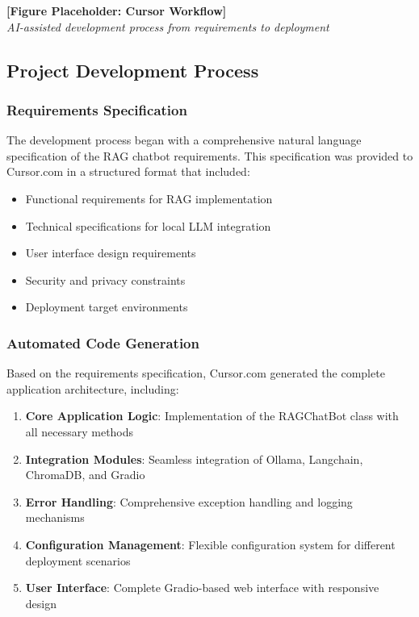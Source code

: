 \documentclass[12pt,letterpaper]{article}
\begin{document}
\begin{center}
\textbf{[Figure Placeholder: Cursor Workflow]}\\
\textit{AI-assisted development process from requirements to deployment}
\end{center}

\subsection{Project Development Process}

\subsubsection{Requirements Specification}

The development process began with a comprehensive natural language specification of the RAG chatbot requirements. This specification was provided to Cursor.com in a structured format that included:

\begin{itemize}
    \item Functional requirements for RAG implementation
    \item Technical specifications for local LLM integration
    \item User interface design requirements
    \item Security and privacy constraints
    \item Deployment target environments
\end{itemize}

\subsubsection{Automated Code Generation}

Based on the requirements specification, Cursor.com generated the complete application architecture, including:

\begin{enumerate}
    \item \textbf{Core Application Logic}: Implementation of the RAGChatBot class with all necessary methods
    \item \textbf{Integration Modules}: Seamless integration of Ollama, Langchain, ChromaDB, and Gradio
    \item \textbf{Error Handling}: Comprehensive exception handling and logging mechanisms
    \item \textbf{Configuration Management}: Flexible configuration system for different deployment scenarios
    \item \textbf{User Interface}: Complete Gradio-based web interface with responsive design
\end{enumerate}
\end{document}
